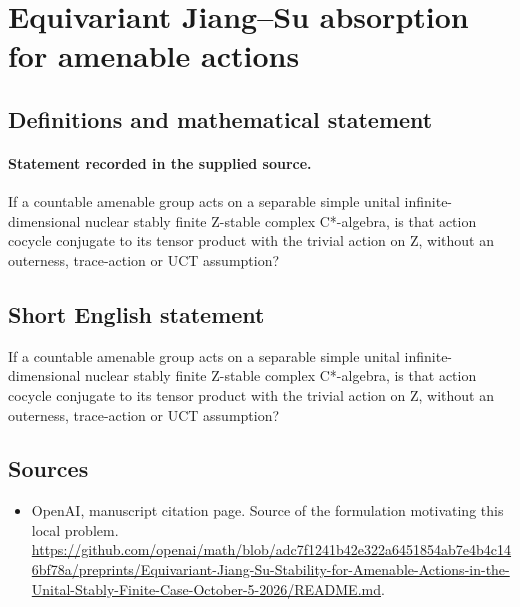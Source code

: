 \documentclass[11pt]{article}
\begin{document}
\section*{Equivariant Jiang–Su absorption for amenable actions}\label{statement}
\subsection{Definitions and mathematical statement}
\paragraph{Statement recorded in the supplied source.}
If a countable amenable group acts on a separable simple unital infinite-dimensional nuclear stably finite Z-stable complex C*-algebra, is that action cocycle conjugate to its tensor product with the trivial action on Z, without an outerness, trace-action or UCT assumption?
\subsection{Short English statement}
If a countable amenable group acts on a separable simple unital infinite-dimensional nuclear stably finite Z-stable complex C*-algebra, is that action cocycle conjugate to its tensor product with the trivial action on Z, without an outerness, trace-action or UCT assumption?
\subsection{Sources}
\begin{itemize}
\item[S1] OpenAI, manuscript citation page. Source of the formulation motivating this local problem.
\url{https://github.com/openai/math/blob/adc7f1241b42e322a6451854ab7e4b4c146bf78a/preprints/Equivariant-Jiang-Su-Stability-for-Amenable-Actions-in-the-Unital-Stably-Finite-Case-October-5-2026/README.md}.
\end{itemize}
\end{document}
